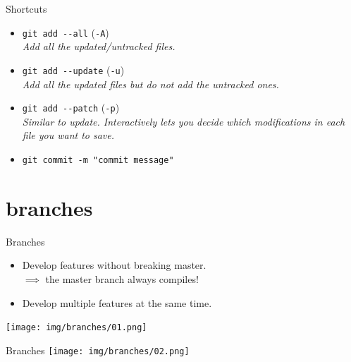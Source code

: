\documentclass[usenames,dvipsnames,9pt]{beamer}
\begin{document}
%
\begin{frame}{Shortcuts}
  \begin{itemize}
    \item \lstinline|git add --all| \hspace{1cm}(\lstinline|-A|)\\
    \emph{Add all the updated/untracked files.}
    \item \lstinline|git add --update| \hspace{1cm}(\lstinline|-u|)\\
    \emph{Add all the updated files but do not add the untracked ones.}
    \item \lstinline|git add --patch| \hspace{1cm}(\lstinline|-p|)\\
    \emph{Similar to update. Interactively lets you decide which modifications in each file you want to save.}
    \item \lstinline|git commit -m "commit message"|
  \end{itemize}
\end{frame}



%
%
\section{branches}

%
\begin{frame}{Branches}
  \begin{itemize}
    \item Develop features without breaking master.\\
    $\implies$ the master branch always compiles! {\color{OliveGreen}\checkmark}
    \item Develop multiple features at the same time.
  \end{itemize}
  \vspace{0.5cm}
  \texttt{[image: img/branches/01.png]}
\end{frame}

%
\begin{frame}{Branches}
  \vspace{-0.45cm}
  \texttt{[image: img/branches/02.png]}
\end{frame}
\end{document}
